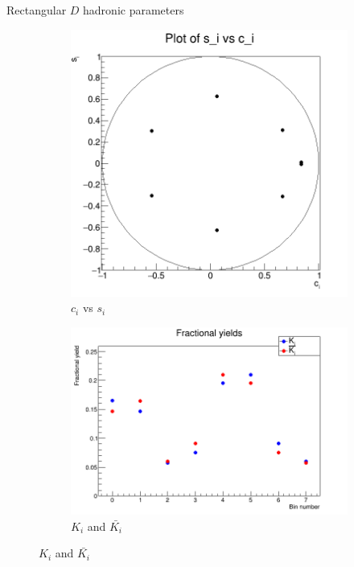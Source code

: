 \documentclass{beamer}
\begin{document}
\begin{frame}{Rectangular $D$ hadronic parameters}
  \begin{figure}
    \centering
    \vspace{-0.2cm}
    \begin{subfigure}{0.5\textwidth}
      \includegraphics[width = 1.0\textwidth]{SophisticatedX3X4Grid_8bins_2binregions_95regions_cs.png}
      \caption{$c_i$ vs $s_i$}
    \end{subfigure}%
    \begin{subfigure}{0.5\textwidth}
      \includegraphics[width = 1.0\textwidth]{SophisticatedX3X4Grid_8bins_2binregions_95regions_KKbar.png}
      \caption{$K_i$ and $\bar{K_i}$}
    \end{subfigure}
  \end{figure}
\end{frame}
\end{document}
